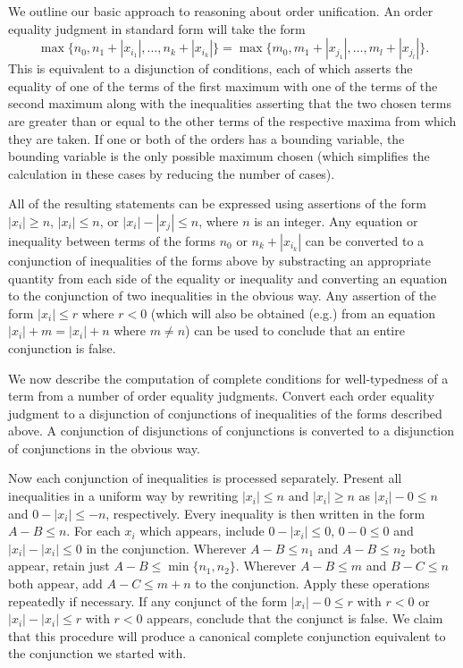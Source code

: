 \documentclass{article}
\begin{document}
We outline our basic approach to reasoning about order unification.
An order equality judgment in standard form will take the form
$$\max\{n_0,n_1+|x_{i_1}|,\ldots,n_k+|x_{i_k}|\}
=\max\{m_0,m_1+|x_{j_1}|,\ldots,m_l+|x_{j_l}|\}.$$  This is equivalent
to a disjunction of conditions, each of which asserts the equality of
one of the terms of the first maximum with one of the terms of the
second maximum along with the inequalities asserting that the two
chosen terms are greater than or equal to the other terms of the
respective maxima from which they are taken.  If one or both of the
orders has a bounding variable, the bounding variable is the only
possible maximum chosen (which simplifies the calculation in these
cases by reducing the number of cases).

All of the resulting statements can be expressed using assertions of
the form $|x_i| \geq n$, $|x_i| \leq n$, or $|x_i|-|x_j| \leq n$,
where $n$ is an integer.  Any equation or inequality between terms of
the forms $n_0$ or $n_k+|x_{i_k}|$ can be converted to a conjunction
of inequalities of the forms above by substracting an appropriate
quantity from each side of the equality or inequality and converting
an equation to the conjunction of two inequalities in the obvious way.
Any assertion of the form $|x_i| \leq r$ where $r<0$ (which will also
be obtained (e.g.) from an equation $|x_i|+m = |x_i|+n$ where $m \neq n$) can
be used to conclude that an entire conjunction is false.

We now describe the computation of complete conditions for
well-typedness of a term from a number of order equality judgments.
Convert each order equality judgment to a disjunction of conjunctions
of inequalities of the forms described above.  A conjunction of
disjunctions of conjunctions is converted to a disjunction of
conjunctions in the obvious way.

Now each conjunction of inequalities is processed separately.  Present
all inequalities in a uniform way by rewriting $|x_i| \leq n$ and $|x_i|
\geq n$ as $|x_i|-0 \leq n$ and $0-|x_i| \leq -n$, respectively.  Every
inequality is then written in the form $A - B \leq n$.  For each $x_i$
which appears, include $0 - |x_i| \leq 0$, $0-0\leq 0$ and
$|x_i|-|x_i| \leq 0$ in the conjunction.  Wherever $A - B \leq n_1$
and $A - B \leq n_2$ both appear, retain just $A - B \leq
\min\{n_1,n_2\}$.  Wherever $A - B \leq m$ and $B - C \leq n$ both
appear, add $A - C \leq m+n$ to the conjunction.  Apply these
operations repeatedly if necessary.  If any conjunct of the form
$|x_i| - 0 \leq r$ with $r<0$ or $|x_i| - |x_i| \leq r$ with $r<0$
appears, conclude that the conjunct is false.  We claim that this
procedure will produce a canonical complete conjunction equivalent to
the conjunction we started with.
\end{document}
